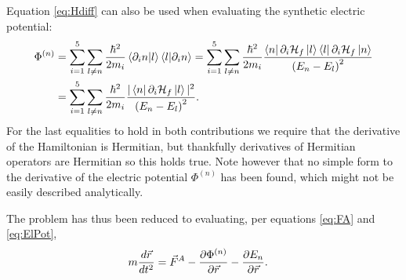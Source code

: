 \documentclass[a4paper]{article}
\begin{document}
Equation \ref{eq:Hdiff} can also be used when evaluating the synthetic
electric potential:
\begin{align}\label{eq:ElPot}
        \Phi^{(n)} &= \sum_{i=1}^{5} \sum_{l \ne n} \frac{\hbar{}^2}{2m_i}\bra{\partial_i
    n}\ket{l}\bra{l}\ket{\partial_i n} = \sum_{i=1}^{5} \sum_{l \ne n}
    \frac{\hbar{}^2}{2m_i}\frac{\bra{n}\partial_i \mathbb{\cal H}_f\ket{l}\bra{l}\partial_i
    \mathbb{\cal H}_f\ket{n}}{\pqty{E_n-E_l}^2}\\
    &= \sum_{i=1}^{5} \sum_{l \ne n}
    \frac{\hbar{}^2}{2m_i}\frac{|\bra{n}\partial_i \mathbb{\cal H}_f\ket{l}|^2}{\pqty{E_n-E_l}^2}
.\end{align}
For the last equalities to hold in both contributions we require that the derivative of the Hamiltonian is
Hermitian, but thankfully derivatives of Hermitian operators are Hermitian so this holds
true.
Note however that no simple form to the derivative of the electric potential \(\Phi^{(n)}\) has
been found, which might not be easily described analytically.

The problem has thus been reduced to evaluating, per equations \ref{eq:FA} and
\ref{eq:ElPot},
\begin{align}\label{eq:dynfin}
        m\frac{d \vec{r}}{d t^2} &= \vec{F}^A-\frac{\partial \Phi^{(n)}}{\partial
        \vec{r}} - \frac{\partial E_n}{\partial \vec{r}} 
.\end{align}
\end{document}
